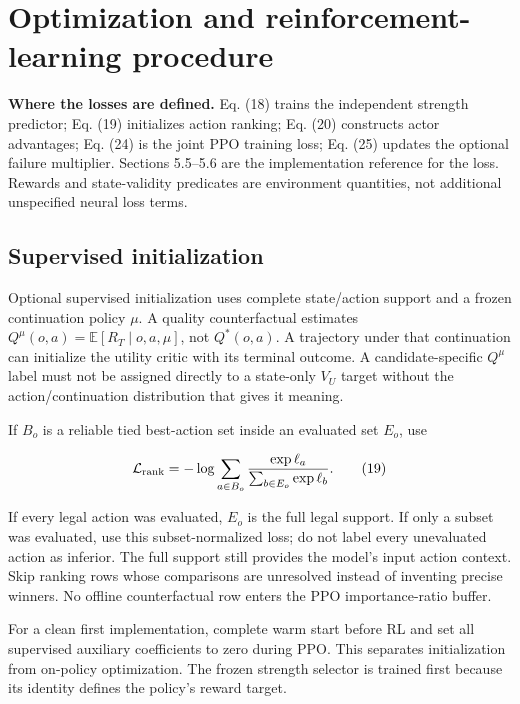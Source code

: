 \documentclass[10pt,a4paper]{article}
\begin{document}
\hypertarget{optimization-and-reinforcement-learning-procedure}{%
\section{Optimization and reinforcement-learning
procedure}\label{optimization-and-reinforcement-learning-procedure}}

\textbf{Where the losses are defined.} Eq. (18) trains the independent
strength predictor; Eq. (19) initializes action ranking; Eq. (20)
constructs actor advantages; Eq. (24) is the joint PPO training loss;
Eq. (25) updates the optional failure multiplier. Sections 5.5--5.6 are
the implementation reference for the loss. Rewards and state-validity
predicates are environment quantities, not additional unspecified neural
loss terms.

\hypertarget{supervised-initialization}{%
\subsection{Supervised initialization}\label{supervised-initialization}}

Optional supervised initialization uses complete state/action support
and a frozen continuation policy \(\mu\). A quality counterfactual
estimates \(Q^\mu(o,a)=\mathbb E[R_T\mid o,a,\mu]\), not \(Q^*(o,a)\). A
trajectory under that continuation can initialize the utility critic
with its terminal outcome. A candidate-specific \(Q^\mu\) label must not
be assigned directly to a state-only \(V_U\) target without the
action/continuation distribution that gives it meaning.

If \(B_o\) is a reliable tied best-action set inside an evaluated set
\(E_o\), use

\[
\mathcal L_{\rm rank}
=-\log\sum_{a\in B_o}
\frac{\exp\ell_a}{\sum_{b\in E_o}\exp\ell_b}.
\tag{19}
\]

If every legal action was evaluated, \(E_o\) is the full legal support.
If only a subset was evaluated, use this subset-normalized loss; do not
label every unevaluated action as inferior. The full support still
provides the model's input action context. Skip ranking rows whose
comparisons are unresolved instead of inventing precise winners. No
offline counterfactual row enters the PPO importance-ratio buffer.

For a clean first implementation, complete warm start before RL and set
all supervised auxiliary coefficients to zero during PPO. This separates
initialization from on-policy optimization. The frozen strength selector
is trained first because its identity defines the policy's reward
target.
\end{document}
